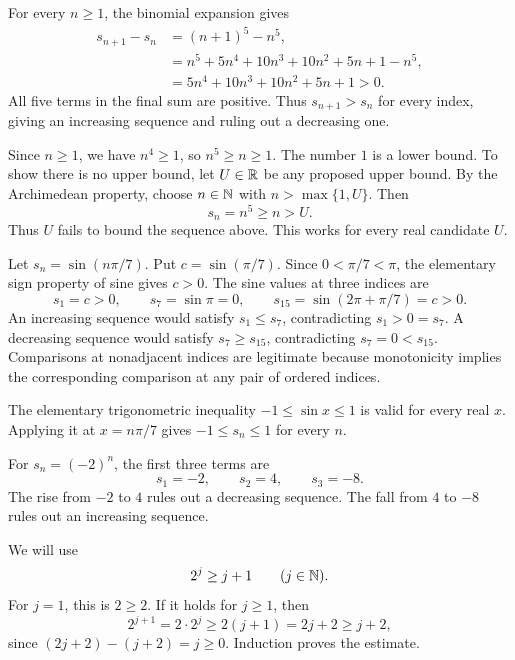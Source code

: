 For every $n\ge1$, the binomial expansion gives
\begin{align*}
 s_{n+1}-s_n
   &=(n+1)^5-n^5,\\
   &=n^5+5n^4+10n^3+10n^2+5n+1-n^5,\\
   &=5n^4+10n^3+10n^2+5n+1>0.
\end{align*}
All five terms in the final sum are positive. Thus $s_{n+1}>s_n$
for every index, giving an increasing sequence and ruling out a
decreasing one.

Since $n\ge1$, we have $n^4\ge1$, so $n^5\ge n\ge1$.
The number $1$ is a lower bound. To show there is no upper bound,
let $U\in\mathbb{R}$ be any proposed upper bound. By the Archimedean
property, choose $n\in\mathbb{N}$ with $n>\max\{1,U\}$. Then
\[
 s_n=n^5\ge n>U.
\]
Thus $U$ fails to bound the sequence above. This works for every real
candidate $U$.


Let $s_n=\sin(n\pi/7)$. Put $c=\sin(\pi/7)$.
Since $0<\pi/7<\pi$, the elementary sign property of sine gives
$c>0$. The sine values at three indices are
\[
 s_1=c>0,\qquad s_7=\sin\pi=0,\qquad
 s_{15}=\sin(2\pi+\pi/7)=c>0.
\]
An increasing sequence would satisfy $s_1\le s_7$, contradicting
$s_1>0=s_7$. A decreasing sequence would satisfy $s_7\ge s_{15}$,
contradicting $s_7=0<s_{15}$. Comparisons at nonadjacent indices are
legitimate because monotonicity implies the corresponding comparison
at any pair of ordered indices.

The elementary trigonometric inequality $-1\le\sin x\le1$ is valid
for every real $x$. Applying it at $x=n\pi/7$ gives
$-1\le s_n\le1$ for every $n$.


For $s_n=(-2)^n$, the first three terms are
\[
 s_1=-2,\qquad s_2=4,\qquad s_3=-8.
\]
The rise from $-2$ to $4$ rules out a decreasing sequence. The fall
from $4$ to $-8$ rules out an increasing sequence.

We will use
\[
 2^j\ge j+1\qquad(j\in\mathbb{N}).
\]
For $j=1$, this is $2\ge2$. If it holds for $j\ge1$, then
\[
 2^{j+1}=2\cdot2^j\ge2(j+1)=2j+2\ge j+2,
\]
since $(2j+2)-(j+2)=j\ge0$. Induction proves the estimate.

